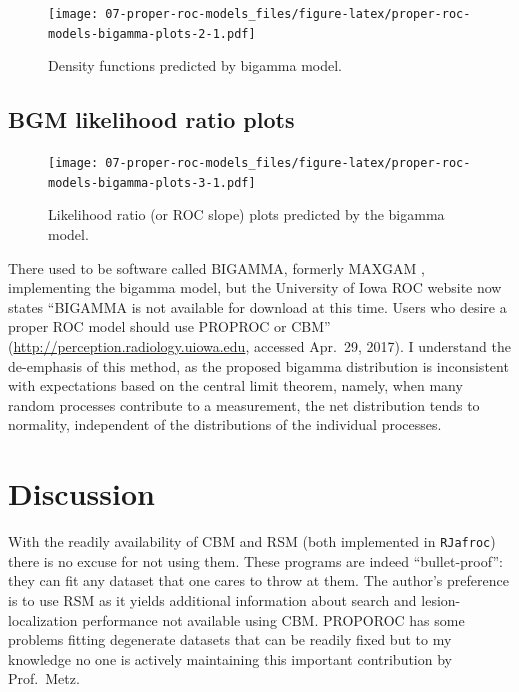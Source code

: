 \documentclass[
]{book}
\begin{document}
\begin{figure}
\centering
\texttt{[image: 07-proper-roc-models\_files/figure-latex/proper-roc-models-bigamma-plots-2-1.pdf]}
\caption{\label{fig:proper-roc-models-bigamma-plots-2}Density functions predicted by bigamma model.}
\end{figure}

\hypertarget{proper-roc-models-bigamma-slopes}{%
\subsection{BGM likelihood ratio plots}\label{proper-roc-models-bigamma-slopes}}

\begin{figure}
\centering
\texttt{[image: 07-proper-roc-models\_files/figure-latex/proper-roc-models-bigamma-plots-3-1.pdf]}
\caption{\label{fig:proper-roc-models-bigamma-plots-3}Likelihood ratio (or ROC slope) plots predicted by the bigamma model.}
\end{figure}

There used to be software called BIGAMMA, formerly MAXGAM \citep{dorfman1997proper}, implementing the bigamma model, but the University of Iowa ROC website now states ``BIGAMMA is not available for download at this time. Users who desire a proper ROC model should use PROPROC or CBM'' (\url{http://perception.radiology.uiowa.edu}, accessed Apr.~29, 2017). I understand the de-emphasis of this method, as the proposed bigamma distribution is inconsistent with expectations based on the central limit theorem, namely, when many random processes contribute to a measurement, the net distribution tends to normality, independent of the distributions of the individual processes.

\hypertarget{proper-roc-models-discussion}{%
\section{Discussion}\label{proper-roc-models-discussion}}

With the readily availability of CBM and RSM (both implemented in \texttt{RJafroc}) there is no excuse for not using them. These programs are indeed ``bullet-proof'': they can fit any dataset that one cares to throw at them. The author's preference is to use RSM as it yields additional information about search and lesion-localization performance not available using CBM. PROPOROC has some problems fitting degenerate datasets that can be readily fixed but to my knowledge no one is actively maintaining this important contribution by Prof.~Metz.
\end{document}
